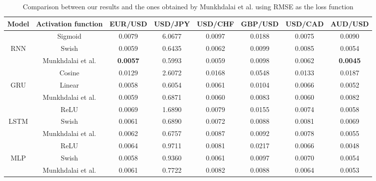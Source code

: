 ﻿\documentclass{ieeeaccess}
\begin{document}

\begin{table}[t]
  \caption{Comparison between our results and the ones obtained by Munkhdalai et al. using RMSE as the loss function}
  \small
  \centering
  \begin{tabular*}{0.9\textwidth}{c @{\extracolsep{\fill}} ccccccc}
    \hline
    \textbf{Model} & \textbf{Activation function} & \textbf{EUR/USD} & \textbf{USD/JPY} & \textbf{USD/CHF} & \textbf{GBP/USD} & \textbf{USD/CAD} & \textbf{AUD/USD} \\
    \hline

           & Sigmoid & 0.0079 & 6.0677 & 0.0097 & 0.0188 & 0.0075 & 0.0090 \\
    RNN    & Swish & 0.0059 & 0.6435 & 0.0062 & 0.0099 & 0.0085 & 0.0054 \\
           & Munkhdalai et al. & \textbf{0.0057} & 0.5993 & 0.0059 & 0.0098 & 0.0062 & \textbf{0.0045} \\

    \hline

           & Cosine & 0.0129 & 2.6072 & 0.0168 & 0.0548 & 0.0133 & 0.0187 \\
    GRU    & Linear & 0.0058 & 0.6054 & 0.0061 & 0.0104 & 0.0066 & 0.0052 \\
           & Munkhdalai et al. & 0.0059 & 0.6871 & 0.0060 & 0.0083 & 0.0060 & 0.0082 \\

    \hline

           & ReLU & 0.0069 & 1.6890 & 0.0079 & 0.0155 & 0.0074 & 0.0058 \\
    LSTM   & Swish & 0.0061 & 0.6890 & 0.0072 & 0.0088 & 0.0081 & 0.0069 \\
           & Munkhdalai et al. & 0.0062 & 0.6757 & 0.0087 & 0.0092 & 0.0078 & 0.0055 \\
    
    \hline

           & ReLU & 0.0064 & 0.9711 & 0.0081 & 0.0217 & 0.0066 & 0.0048 \\
    MLP    & Swish & 0.0058 & 0.9360 & 0.0061 & 0.0097 & 0.0070 & 0.0054 \\
           & Munkhdalai et al. & 0.0061 & 0.7722 & 0.0082 & 0.0088 & 0.0064 & 0.0053 \\


\end{tabular*}
\end{table}
\end{document}
